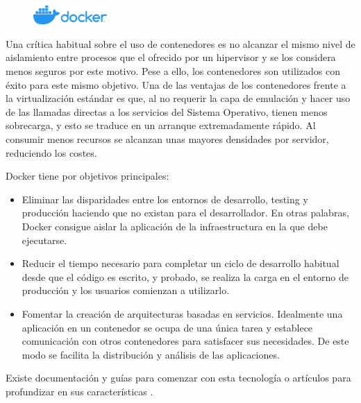 \begin{figure}
    \centering
    \includegraphics[width=0.25\textwidth]{imaxes/e-fundamentos-tecnologicos/logo-docker.png}
\end{figure}

Una crítica habitual sobre el uso de contenedores es no alcanzar el mismo nivel de aislamiento entre procesos que el ofrecido por un hipervisor y se los considera menos seguros por este motivo. Pese a ello, los contenedores son utilizados con éxito para este mismo objetivo. Una de las ventajas de los contenedores frente a la virtualización estándar es que, al no requerir la capa de emulación y hacer uso de las llamadas directas a los servicios del Sistema Operativo, tienen menos sobrecarga, y esto se traduce en un arranque extremadamente rápido. Al consumir menos recursos se alcanzan unas mayores densidades por servidor, reduciendo los costes.

Docker tiene por objetivos principales:
\begin{itemize}
    \item Eliminar las disparidades entre los entornos de desarrollo, testing y producción haciendo que no existan para el desarrollador. En otras palabras, Docker consigue aislar la aplicación de la infraestructura en la que debe ejecutarse.
    \item Reducir el tiempo necesario para completar un ciclo de desarrollo habitual desde que el código es escrito, y probado, se realiza la carga en el entorno de producción y los usuarios comienzan a utilizarlo.
    \item Fomentar la creación de arquitecturas basadas en servicios. Idealmente una aplicación en un contenedor se ocupa de una única tarea y establece comunicación con otros contenedores para satisfacer sus necesidades. De este modo se facilita la distribución y análisis de las aplicaciones.
\end{itemize}

Existe documentación y guías para comenzar con esta tecnología \cite{dockerInc_web_startGuides} o artículos para profundizar en sus características \cite{turnbull_book_dockerBook}.

